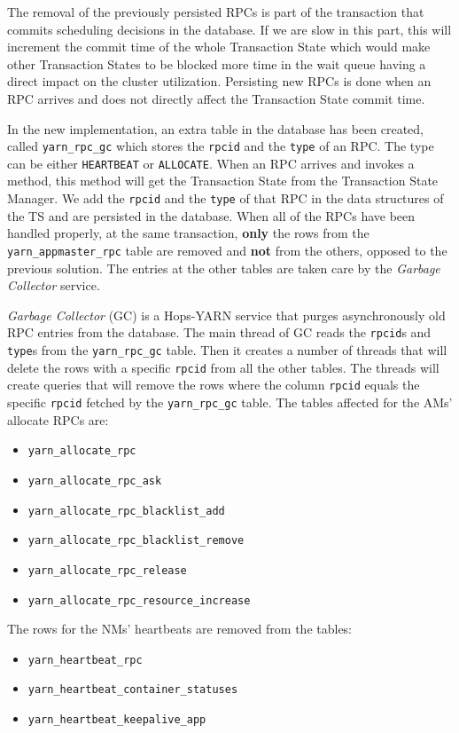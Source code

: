 The removal of the previously persisted RPCs is part of the
transaction that commits scheduling decisions in the database. If we
are slow in this part, this will increment the commit time of the
whole Transaction State which would make other Transaction States to
be blocked more time in the wait queue having a direct impact on the
cluster utilization. Persisting new RPCs is done when an RPC arrives
and does not directly affect the Transaction State commit time.

In the new implementation, an extra table in the
database has been created, called \texttt{yarn\_rpc\_gc} which stores the \texttt{rpcid}
and the \texttt{type} of an RPC. The type can be either
\texttt{HEARTBEAT} or \texttt{ALLOCATE}. When an RPC arrives and
invokes a method, this method will get the Transaction State from the
Transaction State Manager. We add the \texttt{rpcid} and the
\texttt{type} of that RPC in the data structures of the TS and are
persisted in the database. When all of the RPCs have been handled
properly, at the same transaction, \textbf{only} the rows from
the \texttt{yarn\_appmaster\_rpc} table are removed and \textbf{not}
from the others, opposed to the previous solution. The entries at the other tables are taken care by the
\emph{Garbage Collector} service.

\emph{Garbage Collector} (GC) is a Hops-YARN service that purges
asynchronously old RPC entries from the database. The main thread of
GC reads the \texttt{rpcid}s and \texttt{type}s from the
\texttt{yarn\_rpc\_gc} table. Then it creates a number of threads that
will delete the rows with a specific \texttt{rpcid} from all the other
tables. The threads will create
queries that will remove the rows where the column \texttt{rpcid}
equals the specific \texttt{rpcid} fetched by the
\texttt{yarn\_rpc\_gc} table. The tables affected for the AMs'
allocate RPCs are:
\begin{itemize}
\item \texttt{yarn\_allocate\_rpc}
\item \texttt{yarn\_allocate\_rpc\_ask}
\item \texttt{yarn\_allocate\_rpc\_blacklist\_add}
\item \texttt{yarn\_allocate\_rpc\_blacklist\_remove}
\item \texttt{yarn\_allocate\_rpc\_release}
\item \texttt{yarn\_allocate\_rpc\_resource\_increase}
\end{itemize}

The rows for the NMs' heartbeats are removed from the tables:
\begin{itemize}
\item \texttt{yarn\_heartbeat\_rpc}
\item \texttt{yarn\_heartbeat\_container\_statuses}
\item \texttt{yarn\_heartbeat\_keepalive\_app}
\end{itemize}


